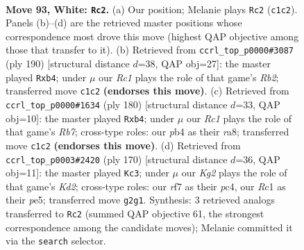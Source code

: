 \documentclass[11pt]{article}
\begin{document}
\clearpage

\begin{figure}[p]\centering
\begin{subfigure}{0.46\textwidth}\centering
\resizebox{\linewidth}{!}{%
\newchessgame
\chessboard[
  setfen={8/4kr2/p7/P1p2p1p/1pp2P1P/4P1P1/1P4K1/2R5 w - - 6 93},
  showmover=false,
  pgfstyle=straightmove, color=movearrow, markmove={c1-c2}
]}
\caption{}
\end{subfigure}\hfill
\begin{subfigure}{0.46\textwidth}\centering
\resizebox{\linewidth}{!}{%
\newchessgame
\chessboard[
  setfen={4k3/4p3/p2pP1r1/P4p1p/1pP4P/4KPP1/1R6/8 w - - 1 96},
  showmover=false,
  pgfstyle=straightmove, color=movearrow, markmove={b2-b4}
]}
\caption{}
\end{subfigure}
\\[4pt]
\begin{subfigure}{0.46\textwidth}\centering
\resizebox{\linewidth}{!}{%
\newchessgame
\chessboard[
  setfen={r7/1Rp5/3p2pk/3Pp1p1/1pP1P3/5PKP/8/8 w - - 5 91},
  showmover=false,
  pgfstyle=straightmove, color=movearrow, markmove={b7-b4}
]}
\caption{}
\end{subfigure}\hfill
\begin{subfigure}{0.46\textwidth}\centering
\resizebox{\linewidth}{!}{%
\newchessgame
\chessboard[
  setfen={8/5k2/1p6/1P2pp1p/2pP2pP/4P1P1/3K1P2/8 w - - 0 86},
  showmover=false,
  pgfstyle=straightmove, color=movearrow, markmove={d2-c3}
]}
\caption{}
\end{subfigure}
\caption{\textbf{Move 93, White: \texttt{Rc2}.} (a) Our position; Melanie plays \texttt{Rc2} (\texttt{c1c2}). Panels (b)--(d) are the retrieved master positions whose correspondence most drove this move (highest QAP objective among those that transfer to it). (b) Retrieved from \texttt{ccrl\_top\_p0000\#3087} (ply 190) [structural distance $d$=38, QAP obj=27]: the master played \texttt{Rxb4}; under $\mu$ our \emph{Rc1} plays the role of that game's \emph{Rb2}; transferred move \texttt{c1c2} \textbf{(endorses this move)}. (c) Retrieved from \texttt{ccrl\_top\_p0000\#1634} (ply 180) [structural distance $d$=33, QAP obj=10]: the master played \texttt{Rxb4}; under $\mu$ our \emph{Rc1} plays the role of that game's \emph{Rb7}; cross-type roles: our \emph{p}b4 as their \emph{r}a8; transferred move \texttt{c1c2} \textbf{(endorses this move)}. (d) Retrieved from \texttt{ccrl\_top\_p0003\#2420} (ply 170) [structural distance $d$=36, QAP obj=11]: the master played \texttt{Kc3}; under $\mu$ our \emph{Kg2} plays the role of that game's \emph{Kd2}; cross-type roles: our \emph{r}f7 as their \emph{p}c4, our \emph{R}c1 as their \emph{p}e5; transferred move \texttt{g2g1}. Synthesis: 3 retrieved analogs transferred to \texttt{Rc2} (summed QAP objective 61, the strongest correspondence among the candidate moves); Melanie committed it via the \texttt{search} selector.}
\label{fig:thought-m184}
\end{figure}
\end{document}

